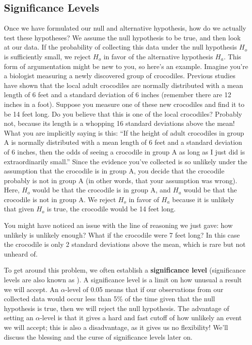 \subsection{Significance Levels}

Once we have formulated our null and alternative hypothesis, how do we actually test these hypotheses? We assume the null hypothesis to be true, and then look at our data.  If the probability of collecting this data under the null hypothesis $H_o$ is sufficiently small, we reject $H_o$ in favor of the alternative hypothesis $H_a$. This form of argumentation might be new to you, so here's an example. Imagine you're a biologist measuring a newly discovered group of crocodiles. Previous studies have shown that the local adult crocodiles are normally distributed with a mean length of 6 feet and a standard deviation of 6 inches (remember there are 12 inches in a foot). Suppose you measure one of these new crocodiles and find it to be 14 feet long. Do you believe that this is one of the local crocodiles? Probably not, because its length is a whopping 16 standard deviations above the mean! What you are implicitly saying is this: ``If the height of adult crocodiles in group A is normally distributed with a mean length of 6 feet and a standard deviation of 6 inches, then the odds of seeing a crocodile in group A as long as I just did is extraordinarily small.''  Since the evidence you've collected is so unlikely under the assumption that the crocodile is in group A, you decide that the crocodile probably is not in group A (in other words, that your assumption was wrong). Here, $H_o$ would be that the crocodile is in group A, and $H_a$ would be that the crocodile is not in group A. We reject $H_o$ in favor of $H_a$ because it is unlikely that given $H_o$ is true, the crocodile would be 14 feet long. 

You might have noticed an issue with the line of reasoning we just gave: how unlikely is unlikely enough?  What if the crocodile were 7 feet long? In this case the crocodile is only 2 standard deviations above the mean, which is rare but not unheard of.

To get around this problem, we often establish a \textbf{significance level} (significance levels are also known as ).  A significance level is a limit on how unusual a result we will accept. An $\alpha$-level of 0.05 means that if our observations from our collected data would occur less than 5\% of the time given that the null hypothesis is true, then we will reject the null hypothesis. The advantage of setting an $\alpha$-level is that it gives a hard and fast cutoff of how unlikely an event we will accept; this is also a disadvantage, as it gives us no flexibility! We'll discuss the blessing and the curse of significance levels later on.

